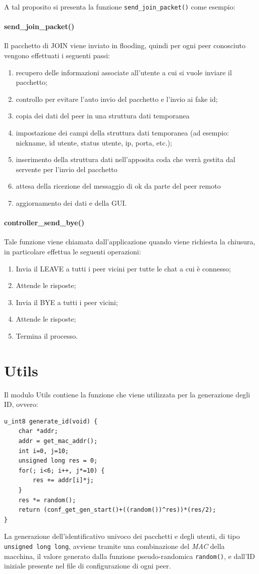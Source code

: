 A tal proposito si presenta la funzione \texttt{send\_join\_packet()} come esempio:
\paragraph{send\_join\_packet()}
Il pacchetto di JOIN viene inviato in flooding, quindi per ogni peer conosciuto vengono effettuati i seguenti passi:
\begin{enumerate}
\item recupero delle informazioni associate all'utente a cui si vuole inviare il pacchetto;
\item controllo per evitare l'auto invio del pacchetto e l'invio ai fake id;
\item copia dei dati del peer in una struttura dati temporanea
\item impostazione dei campi della struttura dati temporanea (ad esempio: nickname, id utente, status utente, ip, porta, etc.);
\item inserimento della struttura dati nell'apposita coda che verrà gestita dal servente per l'invio del pacchetto
\item attesa della ricezione del messaggio di ok da parte del peer remoto
\item aggiornamento dei dati e della GUI.
\end{enumerate}
\paragraph{controller\_send\_bye()}
Tale funzione viene chiamata dall'applicazione quando viene richiesta la chiusura, in particolare effettua le seguenti operazioni:
\begin{enumerate}
\item Invia il LEAVE a tutti i peer vicini per tutte le chat a cui è connesso;
\item Attende le risposte;
\item Invia il BYE a tutti i peer vicini;
\item Attende le risposte;
\item Termina il processo.
\end{enumerate}
\section{Utils}
Il modulo Utils contiene la funzione che viene utilizzata per la generazione degli ID, ovvero:
\begin{lstlisting}[]
u_int8 generate_id(void) {
	char *addr;
	addr = get_mac_addr();
	int i=0, j=10;
	unsigned long res = 0;
	for(; i<6; i++, j*=10) {
		res += addr[i]*j;
	}
	res *= random();
	return (conf_get_gen_start()+((random())^res))*(res/2);
}
\end{lstlisting}
La generazione dell'identificativo univoco dei pacchetti e degli utenti, di tipo \texttt{unsigned long long}, avviene tramite una combinazione del \textit{MAC} della macchina, il valore generato dalla funzione pseudo-randomica \texttt{random()}, e dall'ID iniziale presente nel file di configurazione di ogni peer.
